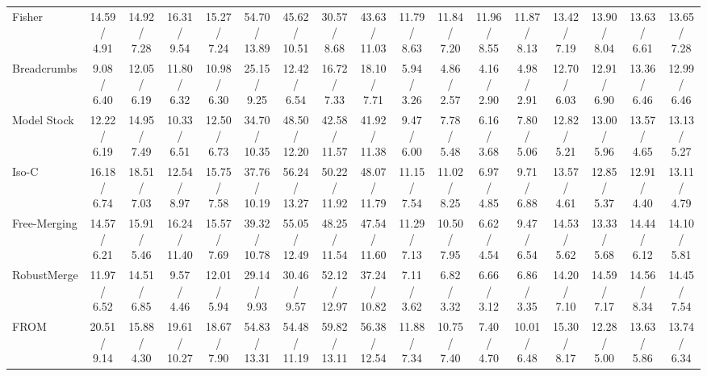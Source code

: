 \documentclass[letterpaper]{article} %
\newcommand{\pub}[1]{{\color{gray}{\footnotesize{[{#1}]}}}}
\begin{document}
\begin{table}[!t]
{\begin{tabular}{l||ccc:c|ccc:c|ccc:c|ccc:c}
Fisher\pub{NeurIPS 2022} & 14.59 / 4.91 & 14.92 / 7.28 & 16.31 / 9.54 & 15.27 / 7.24 & 54.70 / 13.89 & 45.62 / 10.51 & 30.57 / 8.68 & 43.63 / 11.03 & 11.79 / 8.63 & 11.84 / 7.20 & 11.96 / 8.55 & 11.87 / 8.13 & 13.42 / 7.19 & 13.90 / 8.04 & 13.63 / 6.61 & 13.65 / 7.28 \\

Breadcrumbs\pub{ECCV 2024} & 9.08 / 6.40 & 12.05 / 6.19 & 11.80 / 6.32 & 10.98 / 6.30 & 25.15 / 9.25 & 12.42 / 6.54 & 16.72 / 7.33 & 18.10 / 7.71 & 5.94 / 3.26 & 4.86 / 2.57 & 4.16 / 2.90 & 4.98 / 2.91 & 12.70 / 6.03 & 12.91 / 6.90 & 13.36 / 6.46 & 12.99 / 6.46 \\

Model Stock\pub{ECCV 2024} & 12.22 / 6.19 & 14.95 / 7.49 & 10.33 / 6.51 & 12.50 / 6.73 & 34.70 / 10.35 & 48.50 / 12.20 & 42.58 / 11.57 & 41.92 / 11.38 & 9.47 / 6.00 & 7.78 / 5.48 & 6.16 / 3.68 & 7.80 / 5.06 & 12.82 / 5.21 & 13.00 / 5.96 & 13.57 / 4.65 & 13.13 / 5.27 \\

Iso-C\pub{ICML 2025} & 16.18 / 6.74 & 18.51 / 7.03 & 12.54 / 8.97 & 15.75 / 7.58 & 37.76 / 10.19 & 56.24 / 13.27 & 50.22 / 11.92 & 48.07 / 11.79 & 11.15 / 7.54 & 11.02 / 8.25 & 6.97 / 4.85 & 9.71 / 6.88 & 13.57 / 4.61 & 12.85 / 5.37 & 12.91 / 4.40 & 13.11 / 4.79 \\

Free-Merging\pub{ICCV 2025} & 14.57 / 6.21 & 15.91 / 5.46 & 16.24 / 11.40 & 15.57 / 7.69 & 39.32 / 10.78 & 55.05 / 12.49 & 48.25 / 11.54 & 47.54 / 11.60 & 11.29 / 7.13 & 10.50 / 7.95 & 6.62 / 4.54 & 9.47 / 6.54 & 14.53 / 5.62 & 13.33 / 5.68 & 14.44 / 6.12 & 14.10 / 5.81 \\

RobustMerge\pub{NeurIPS 2025} & 11.97 / 6.52 & 14.51 / 6.85 & 9.57 / 4.46 & 12.01 / 5.94 & 29.14 / 9.93 & 30.46 / 9.57 & 52.12 / 12.97 & 37.24 / 10.82 & 7.11 / 3.62 & 6.82 / 3.32 & 6.66 / 3.12 & 6.86 / 3.35 & 14.20 / 7.10 & 14.59 / 7.17 & 14.56 / 8.34 & 14.45 / 7.54 \\

FROM\pub{AAAI 2026} & 20.51 / 9.14 & 15.88 / 4.30 & 19.61 / 10.27 & 18.67 / 7.90 & 54.83 / 13.31 & 54.48 / 11.19 & 59.82 / 13.11 & 56.38 / 12.54 & 11.88 / 7.34 & 10.75 / 7.40 & 7.40 / 4.70 & 10.01 / 6.48 & 15.30 / 8.17 & 12.28 / 5.00 & 13.63 / 5.86 & 13.74 / 6.34 \\


\end{tabular}}
\end{table}
\end{document}
